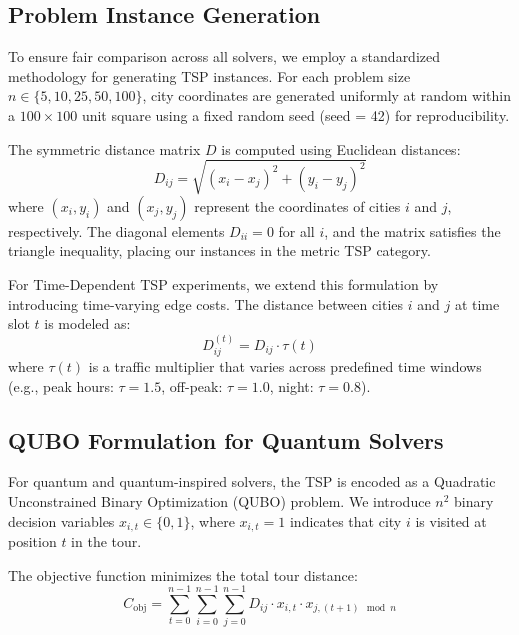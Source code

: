 \documentclass[conference]{IEEEtran}
\begin{document}
\subsection{Problem Instance Generation}

To ensure fair comparison across all solvers, we employ a standardized methodology for generating TSP instances. For each problem size $n \in \{5, 10, 25, 50, 100\}$, city coordinates are generated uniformly at random within a $100 \times 100$ unit square using a fixed random seed (seed = 42) for reproducibility.

The symmetric distance matrix $D$ is computed using Euclidean distances:
\begin{equation}
D_{ij} = \sqrt{(x_i - x_j)^2 + (y_i - y_j)^2}
\label{eq:euclidean}
\end{equation}
where $(x_i, y_i)$ and $(x_j, y_j)$ represent the coordinates of cities $i$ and $j$, respectively. The diagonal elements $D_{ii} = 0$ for all $i$, and the matrix satisfies the triangle inequality, placing our instances in the metric TSP category.

For Time-Dependent TSP experiments, we extend this formulation by introducing time-varying edge costs. The distance between cities $i$ and $j$ at time slot $t$ is modeled as:
\begin{equation}
D_{ij}^{(t)} = D_{ij} \cdot \tau(t)
\label{eq:td_distance}
\end{equation}
where $\tau(t)$ is a traffic multiplier that varies across predefined time windows (e.g., peak hours: $\tau = 1.5$, off-peak: $\tau = 1.0$, night: $\tau = 0.8$).

\subsection{QUBO Formulation for Quantum Solvers}

For quantum and quantum-inspired solvers, the TSP is encoded as a Quadratic Unconstrained Binary Optimization (QUBO) problem. We introduce $n^2$ binary decision variables $x_{i,t} \in \{0,1\}$, where $x_{i,t} = 1$ indicates that city $i$ is visited at position $t$ in the tour.

The objective function minimizes the total tour distance:
\begin{equation}
C_{\text{obj}} = \sum_{t=0}^{n-1} \sum_{i=0}^{n-1} \sum_{j=0}^{n-1} D_{ij} \cdot x_{i,t} \cdot x_{j,(t+1) \mod n}
\label{eq:qubo_obj}
\end{equation}
\end{document}
